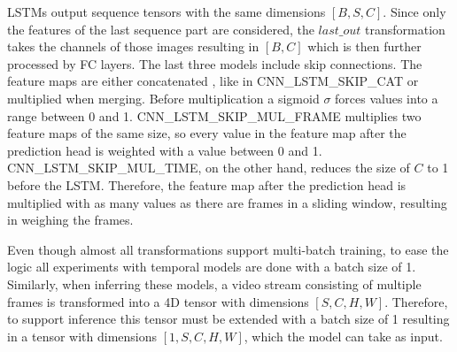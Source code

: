 LSTMs output sequence tensors with the same dimensions $[B, S, C]$.
Since only the features of the last sequence part are considered, the $last\_out$ transformation takes the channels of those images resulting in $[B, C]$ which is then further processed by \ac{FC} layers.
The last three models include skip connections.
The feature maps are either concatenated \cite{pytorch_concat_docu}, like in CNN\_LSTM\_SKIP\_CAT or multiplied when merging.
Before multiplication a sigmoid $\sigma$ \cite{pytorch_sigmoid_docu} forces values into a range between 0 and 1.
CNN\_LSTM\_SKIP\_MUL\_FRAME multiplies two feature maps of the same size, so every value in the feature map after the prediction head is weighted with a value between 0 and 1.
CNN\_LSTM\_SKIP\_MUL\_TIME, on the other hand, reduces the size of $C$ to 1 before the LSTM.
Therefore, the feature map after the prediction head is multiplied with as many values as there are frames in a sliding window, resulting in weighing the frames.

Even though almost all transformations support multi-batch training, to ease the logic all experiments with temporal models are done with a batch size of 1.
Similarly, when inferring these models, a video stream consisting of multiple frames is transformed into a 4D tensor with dimensions $[S, C, H, W]$.
Therefore, to support inference this tensor must be extended with a batch size of 1 resulting in a tensor with dimensions $[1, S, C, H, W]$, which the model can take as input.
